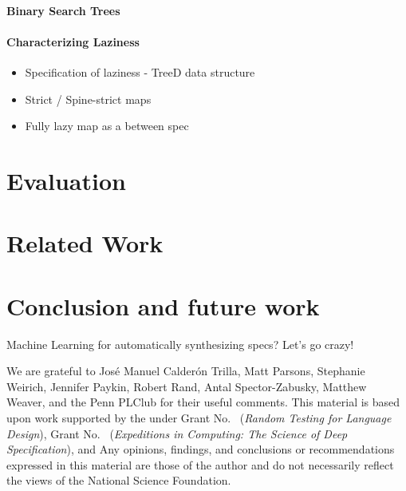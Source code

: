 \documentclass[acmsmall,review]{acmart}\settopmatter{}
\begin{document}
\paragraph*{Binary Search Trees}


\paragraph*{Characterizing Laziness}

\begin{itemize}
\item Specification of laziness - TreeD data structure 
\item Strict / Spine-strict maps
\item Fully lazy map as a between spec
\end{itemize}

\section{Evaluation}
\label{sec:eval}

\section{Related Work}
\label{sec:related}


\section{Conclusion and future work}
\label{sec:concl}

Machine Learning for automatically synthesizing specs? Let's go crazy!

\begin{acks}                            %
We are grateful to
%
José Manuel Calderón Trilla,
Matt Parsons,
Stephanie Weirich,
Jennifer Paykin,
Robert Rand,
Antal Spector-Zabusky,
Matthew Weaver,
and the Penn PLClub
for their useful comments.
This material is based upon work supported by the
 under Grant
No.~ ({\em Random Testing for Language
Design}), Grant No.~ ({\em Expeditions
in Computing: The Science of Deep Specification}), and  Any opinions, findings, and
conclusions or recommendations expressed in this material are those of
the author and do not necessarily reflect the views of the National
Science Foundation.

\end{acks}

%



%
\end{document}
